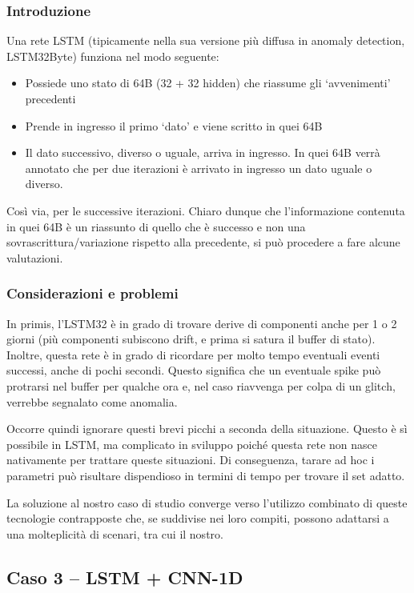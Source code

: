 \subsubsection{Introduzione}

Una rete LSTM (tipicamente nella sua versione più diffusa in anomaly detection, LSTM32Byte) funziona nel modo seguente:
\begin{itemize}
    \item Possiede uno stato di 64B (32 + 32 hidden) che riassume gli ‘avvenimenti’ precedenti
    \item Prende in ingresso il primo ‘dato’ e viene scritto in quei 64B
    \item Il dato successivo, diverso o uguale, arriva in ingresso. In quei 64B verrà annotato che per due iterazioni è arrivato in ingresso un dato uguale o diverso.
\end{itemize}
Così via, per le successive iterazioni. Chiaro dunque che l’informazione contenuta in quei 64B è un riassunto di quello che è successo e non una sovrascrittura/variazione rispetto alla precedente, si può procedere a fare alcune valutazioni.

\subsubsection{Considerazioni e problemi}

In primis, l’LSTM32 è in grado di trovare derive di componenti anche per 1 o 2 giorni (più componenti subiscono drift, e prima si satura il buffer di stato). Inoltre, questa rete è in grado di ricordare per molto tempo eventuali eventi successi, anche di pochi secondi. Questo significa che un eventuale spike può protrarsi nel buffer per qualche ora e, nel caso riavvenga per colpa di un glitch, verrebbe segnalato come anomalia.

Occorre quindi ignorare questi brevi picchi a seconda della situazione. Questo è sì possibile in LSTM, ma complicato in sviluppo poiché questa rete non nasce nativamente per trattare queste situazioni. Di conseguenza, tarare ad hoc i parametri può risultare dispendioso in termini di tempo per trovare il set adatto.

La soluzione al nostro caso di studio converge verso l’utilizzo combinato di queste tecnologie contrapposte che, se suddivise nei loro compiti, possono adattarsi a una molteplicità di scenari, tra cui il nostro.

\subsection{Caso 3 -- LSTM + CNN-1D}

